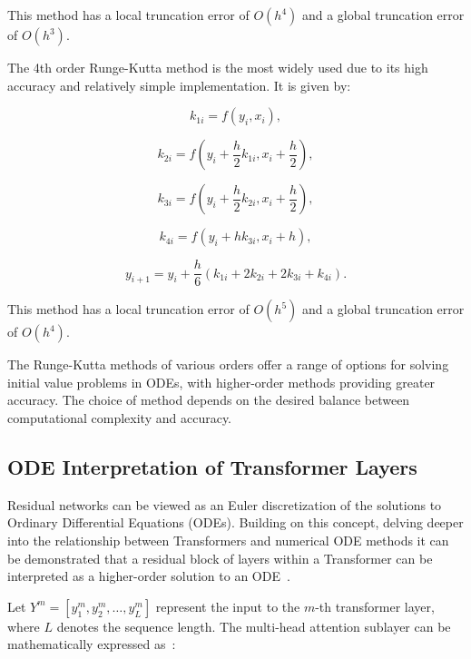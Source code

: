 \documentclass[12pt,a4paper]{report}
\begin{document}
This method has a local truncation error of \( O(h^4) \) and a global truncation error of \( O(h^3) \).

The 4th order Runge-Kutta method is the most widely used due to its high accuracy and relatively simple implementation. It is given by:

\begin{equation}
  k_{1i} = f(y_i, x_i),
\end{equation}

\begin{equation}
  k_{2i} = f\left(y_i + \frac{h}{2} k_{1i}, x_i + \frac{h}{2}\right),
\end{equation}

\begin{equation}
  k_{3i} = f\left(y_i + \frac{h}{2} k_{2i}, x_i + \frac{h}{2}\right),
\end{equation}

\begin{equation}
  k_{4i} = f(y_i + h k_{3i}, x_i + h),
\end{equation}

\begin{equation}
  y_{i+1} = y_i + \frac{h}{6} (k_{1i} + 2k_{2i} + 2k_{3i} + k_{4i}).
\end{equation}

This method has a local truncation error of \( O(h^5) \) and a global truncation error of \( O(h^4) \).

The Runge-Kutta methods of various orders offer a range of options for solving initial value problems in ODEs, with higher-order methods providing greater accuracy. The choice of method depends on the desired balance between computational complexity and accuracy.

\subsection{ODE Interpretation of Transformer Layers}
Residual networks can be viewed as an Euler discretization of the solutions to Ordinary Differential Equations (ODEs). Building on this concept, delving deeper into the relationship between Transformers and numerical ODE methods it can be demonstrated that a residual block of layers within a Transformer can be interpreted as a higher-order solution to an ODE~\cite{li2022ode}.

Let \( Y^m = [y_1^m, y_2^m, \ldots, y_L^m] \) represent the input to the \( m \)-th transformer layer, where \( L \) denotes the sequence length. The multi-head attention sublayer can be mathematically expressed as~\cite{zhong2022neural}:
\end{document}
